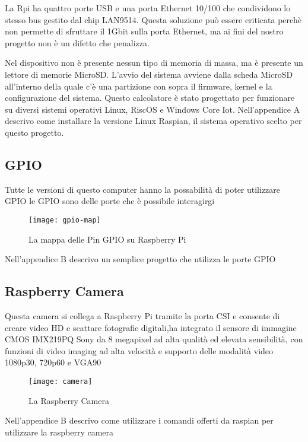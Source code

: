 La Rpi ha quattro porte USB e una porta Ethernet 10/100 che condividono lo stesso bus gestito dal chip LAN9514. Questa soluzione può essere criticata  perchè non permette di sfruttare il 1Gbit sulla porta Ethernet, ma ai fini del nostro progetto non è un difetto che penalizza.


Nel dispositivo non è presente nessun tipo di memoria di massa, ma è presente un lettore di memorie MicroSD.
L'avvio del sistema avviene dalla scheda MicroSD all'interno della quale c'è una partizione con sopra il firmware, kernel e la configurazione del sistema.
Questo calcolatore è stato progettato per funzionare su diversi sistemi operativi Linux, RiscOS e Windows Core Iot.
Nell'appendice A descrivo come installare la versione Linux Raspian, il sistema operativo scelto per questo progetto.

\subsection{GPIO}
Tutte le versioni di questo computer hanno la possabilità di poter utilizzare GPIO  le GPIO sono delle porte che è possibile interagirgi
\begin{figure}[htbp!] 
	\centering    
	\texttt{[image: gpio-map]}
	\caption[Mappa GPIO]{La mappa delle Pin GPIO su Raspberry Pi}
	\label{fig:gpio-map}
\end{figure}
Nell'appendice B descrivo un semplice progetto che utilizza le porte GPIO

\subsection{Raspberry Camera}
Questa camera si collega a Raspberry Pi tramite la porta CSI e consente di creare video HD e scattare fotografie digitali,ha integrato il sensore di immagine CMOS IMX219PQ Sony da 8 megapixel ad alta qualità ed elevata sensibilità, con funzioni di video imaging ad alta velocità e supporto delle modalità video 1080p30, 720p60 e VGA90
\begin{figure}[htbp!] 
	\centering    
	\texttt{[image: camera]}
	\caption[Raspberry Camera]{La Raspberry Camera}
	\label{fig:camera}
\end{figure}
Nell'appendice B descrivo come utilizzare i comandi offerti da raspian per utilizzare la raspberry camera

